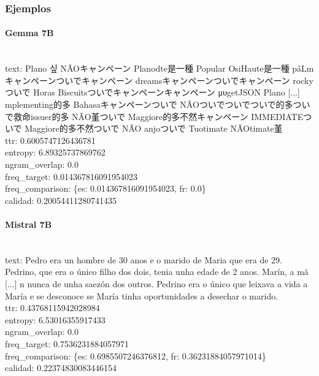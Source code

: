 \subsubsection{Ejemplos}

\paragraph{Gemma 7B}~\\
{text:} Plano 싶 NÃOキャンペーン Planodte是一種 Popular OsiHaute是一種 pâLmキャンペーンついでキャンペーン dreamsキャンペーンついでキャンペーン rockyついで Horas Biscuitsついでキャンペーンキャンペーン μυgetJSON Plano [...] mplementing的多 Bahasaキャンペーンついで NÃOついでついでついで的多ついで救命issuer的多 NÃO堇ついで Maggiore的多不然キャンペーン IMMEDIATEついで Maggiore的多不然ついで NÃO anjoついで Tuotimate NÃOtimate堇\\
{ttr:} 0.6005747126436781\\
{entropy:} 6.89325737869762\\
{ngram\_overlap:} 0.0\\
{freq\_target:} 0.014367816091954023\\
{freq\_comparison:} \{\textquotesingle{}es\textquotesingle{}: 0.014367816091954023, \textquotesingle{}fr\textquotesingle{}: 0.0\}\\
{calidad:} 0.20054411280741435\\

\paragraph{Mistral 7B}~\\
{text:} Pedro era un hombre de 30 anos e o marido de Maria que era de 29. Pedrino, que era o único filho dos dois, tenia unha edade de 2 anos. Marín, a mã [...] n nunca de unha saezón dos outros. Pedrino era o único que leixava a vida a María e se desconoce se María tinha oportunidades a desechar o marido.\\
{ttr:} 0.43768115942028984\\
{entropy:} 6.53016355917433\\
{ngram\_overlap:} 0.0\\
{freq\_target:} 0.7536231884057971\\
{freq\_comparison:} \{\textquotesingle{}es\textquotesingle{}: 0.6985507246376812, \textquotesingle{}fr\textquotesingle{}: 0.36231884057971014\}\\
{calidad:} 0.22374830083446154\\

